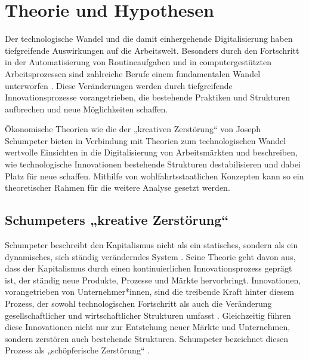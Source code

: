 
\section{Theorie und Hypothesen}

Der technologische Wandel und die damit einhergehende Digitalisierung haben tiefgreifende 
Auswirkungen auf die Arbeitswelt. Besonders durch den Fortschritt in der Automatisierung von 
Routineaufgaben und in computergestützten Arbeitsprozessen sind zahlreiche Berufe einem 
fundamentalen Wandel unterworfen \parencite[vgl.][S. 10–11]{frey2013thefuture}. Diese 
Veränderungen werden durch tiefgreifende Innovationsprozesse vorangetrieben, die bestehende 
Praktiken und Strukturen aufbrechen und neue Möglichkeiten schaffen. 

Ökonomische Theorien wie die der „kreativen Zerstörung“ von Joseph Schumpeter 
\parencite[vgl.][S. 81–86]{schumpeter1976capitalism} bieten in Verbindung mit Theorien zum 
technologischen Wandel wertvolle Einsichten in die Digitalisierung von Arbeitsmärkten und 
beschreiben, wie technologische Innovationen bestehende Strukturen destabilisieren und dabei 
Platz für neue schaffen. Mithilfe von wohlfahrtsstaatlichen Konzepten kann so ein theoretischer 
Rahmen für die weitere Analyse gesetzt werden.


\subsection{Schumpeters „kreative Zerstörung“}

Schumpeter beschreibt den Kapitalismus nicht als ein statisches, sondern als ein dynamisches, 
sich ständig veränderndes System \parencite[vgl.][S. 82]{schumpeter1976capitalism}. Seine Theorie 
geht davon aus, dass der Kapitalismus durch einen kontinuierlichen Innovationsprozess geprägt 
ist, der ständig neue Produkte, Prozesse und Märkte hervorbringt. Innovationen, vorangetrieben 
von Unternehmer*innen, sind die treibende Kraft hinter diesem Prozess, der sowohl technologischen 
Fortschritt als auch die Veränderung gesellschaftlicher und wirtschaftlicher Strukturen umfasst 
\parencite[vgl.][S. 82–83]{schumpeter1976capitalism}. Gleichzeitig führen diese Innovationen 
nicht nur zur Entstehung neuer Märkte und Unternehmen, sondern zerstören auch bestehende 
Strukturen. Schumpeter bezeichnet diesen Prozess als „schöpferische Zerstörung“ 
\parencite[vgl.][S. 83]{schumpeter1976capitalism}. 

